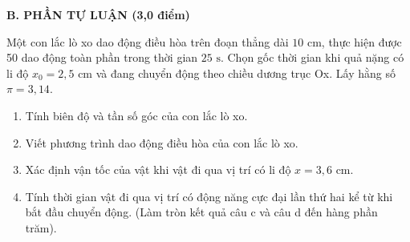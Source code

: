 
\noindent \textbf{B. PHẦN TỰ LUẬN (3,0 điểm)}
\vspace{0.2cm}

\begin{ex}	Một con lắc lò xo dao động điều hòa trên đoạn thẳng dài $10\text{ cm}$, thực hiện được 50 dao động toàn phần trong thời gian $25\text{ s}$. Chọn gốc thời gian khi quả nặng có li độ $x_0=2,5\text{ cm}$ và đang chuyển động theo chiều dương trục Ox. Lấy hằng số $\pi=3,14$.
	\begin{enumerate}
		\item[a)] Tính biên độ và tần số góc của con lắc lò xo.
		\item[b)] Viết phương trình dao động điều hòa của con lắc lò xo.
		\item[c)] Xác định vận tốc của vật khi vật đi qua vị trí có li độ $x=3,6\text{ cm}$.
		\item[d)] Tính thời gian vật đi qua vị trí có động năng cực đại lần thứ hai kể từ khi bắt đầu chuyển động. (Làm tròn kết quả câu c và câu d đến hàng phần trăm).
	\end{enumerate}
\end{ex}

